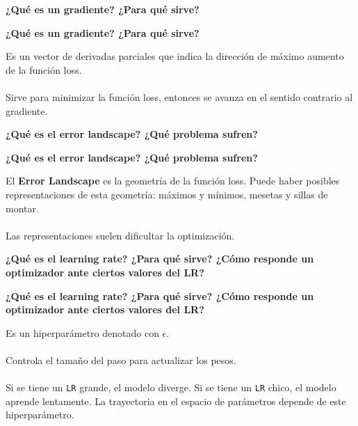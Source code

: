 \documentclass[10pt]{memoir}
\begin{document}

\clearpage
\begin{center}
	\textbf{\Large ¿Qué es un gradiente? ¿Para qué sirve?}
\end{center}

\clearpage
\begin{center}
	\textbf{\Large ¿Qué es un gradiente? ¿Para qué sirve?}
\end{center}
\noindent Es un vector de derivadas parciales que indica la dirección de máximo aumento de la función loss. \\
\\
\noindent Sirve para minimizar la función loss, entonces se avanza en el sentido contrario al gradiente.

\clearpage
\begin{center}
	\textbf{\Large ¿Qué es el error landscape? ¿Qué problema sufren?}
\end{center}

\clearpage
\begin{center}
	\textbf{\Large ¿Qué es el error landscape? ¿Qué problema sufren?}
\end{center}
\noindent El \textbf{Error Landscape} es la geometría de la función loss. Puede haber posibles representaciones de esta geometría: máximos y mínimos, mesetas y sillas de montar. \\
\\
\noindent Las representaciones suelen dificultar la optimización.

\clearpage
\begin{center}
	\textbf{\Large ¿Qué es el learning rate? ¿Para qué sirve? ¿Cómo responde un optimizador ante ciertos valores del LR?}
\end{center}

\clearpage
\begin{center}
	\textbf{\Large ¿Qué es el learning rate? ¿Para qué sirve? ¿Cómo responde un optimizador ante ciertos valores del LR?}
\end{center}
\noindent Es un hiperparámetro denotado con $\epsilon$. \\
\\
\noindent Controla el tamaño del paso para actualizar los pesos. \\
\\
\noindent Si se tiene un \texttt{LR} grande, el modelo diverge. Si se tiene un \texttt{LR} chico, el modelo aprende lentamente. La trayectoria en el espacio de parámetros depende de este hiperparámetro.
\end{document}
